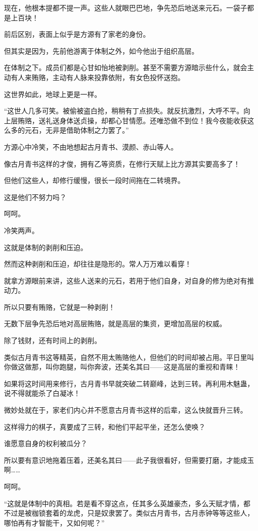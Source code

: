 \begin{this_body}
现在，他根本提都不提一声。这些人就眼巴巴地，争先恐后地送来元石。一袋子都是上百块！

前后区别，表面上似乎是方源有了家老的身份。

但其实是因为，先前他游离于体制之外，如今他出于组织高层。

在体制之下。成员们都是心甘如怡地被剥削。甚至不需要方源暗示些什么，就会主动有人来贿赂，主动有人脉来投靠依附，有女色投怀送抱。

这世界如此，地球上更是一样。

“这世人几多可笑。被偷被盗白抢，稍稍有丁点损失。就反抗激烈，大呼不平。向上层贿赂，送礼送身体送贞操，却都心甘情愿。还唯恐做不到位！我今夜能收获这么多的元石，无非是借助体制之力罢了。”

方源心中冷笑，不由地想起古月青书、漠颜、赤山等人。

像古月青书这样的才俊，拥有乙等资质，在修行天赋上比方源其实要高多了！

但他们这些人，却修行缓慢，很长一段时间拖在二转境界。

这是他们不努力吗？

呵呵。

冷笑两声。

这就是体制的剥削和压迫。

然而这种剥削和压迫，却往往是隐形的。常人万万难以看穿！

就拿方源眼前来讲，这些人送来的元石，若用于他们自身，对自身的修为绝对有推动力。

所以只要有贿赂，它就是一种剥削！

无数下层争先恐后地对高层贿赂，就是高层的集资，更增加高层的权威。

除了钱财，还有时间上的剥削。

类似古月青书这等精英，自然不用太贿赂他人，但他们的时间却被占用。平日里叫你做这做那，叫你跑腿，叫你奔波，还美名其曰——这是高层的重视和青睐！

如果将这时间用来修行，古月青书早就突破二转巅峰，达到三转。再利用木魅蛊，说不得就能杀了白凝冰！

微妙处就在于，家老们内心并不愿意古月青书这样的后辈，这么快就晋升三转。

这样得力的棋子，真要成了三转，和他们平起平坐，还怎么使唤？

谁愿意自身的权利被瓜分？

所以要有意识地拖着压着，还美名其曰——此子我很看好，但需要打磨，才能成玉啊……

呵呵。

“这就是体制中的真相。若是看不穿这点，任其多么英雄豪杰，多么天赋才情，都不过是被枷锁套着的龙虎，只是奴隶罢了。类似古月青书，古月赤钟等等这些人，哪怕再有才智能干，又如何呢？”


\end{this_body}
